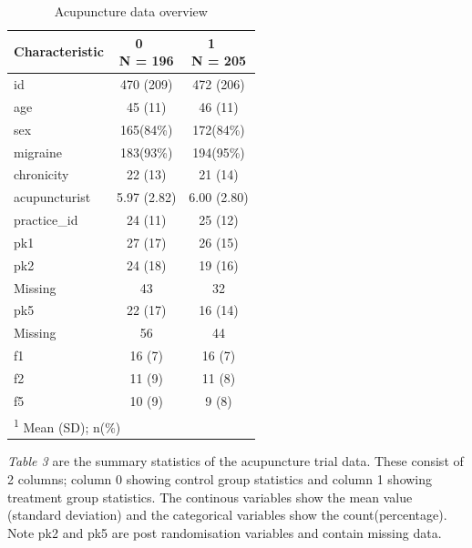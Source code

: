 \documentclass{article}
\begin{document}
\begin{table}

\caption{Acupuncture data overview}
\centering
\begin{tabular}[t]{l|c|c}
\hline
\textbf{Characteristic} & \makecell[c]{\textbf{0}\ \ \\N = 196} & \makecell[c]{\textbf{1}\ \ \\N = 205}\\
\hline
id & 470 (209) & 472 (206)\\
\hline
age & 45 (11) & 46 (11)\\
\hline
sex & 165(84\%) & 172(84\%)\\
\hline
migraine & 183(93\%) & 194(95\%)\\
\hline
chronicity & 22 (13) & 21 (14)\\
\hline
acupuncturist & 5.97 (2.82) & 6.00 (2.80)\\
\hline
practice\_id & 24 (11) & 25 (12)\\
\hline
pk1 & 27 (17) & 26 (15)\\
\hline
pk2 & 24 (18) & 19 (16)\\
\hline
\hspace{1em}Missing & 43 & 32\\
\hline
pk5 & 22 (17) & 16 (14)\\
\hline
\hspace{1em}Missing & 56 & 44\\
\hline
f1 & 16 (7) & 16 (7)\\
\hline
f2 & 11 (9) & 11 (8)\\
\hline
f5 & 10 (9) & 9 (8)\\
\hline
\multicolumn{3}{l}{\rule{0pt}{1em}\textsuperscript{1} Mean (SD); n(\%)}\\
\end{tabular}
\end{table}

\emph{Table 3} are the summary statistics of the acupuncture trial data.
These consist of 2 columns; column 0 showing control group statistics
and column 1 showing treatment group statistics. The continous variables
show the mean value (standard deviation) and the categorical variables
show the count(percentage). Note pk2 and pk5 are post randomisation
variables and contain missing data.

\newpage
\end{document}
